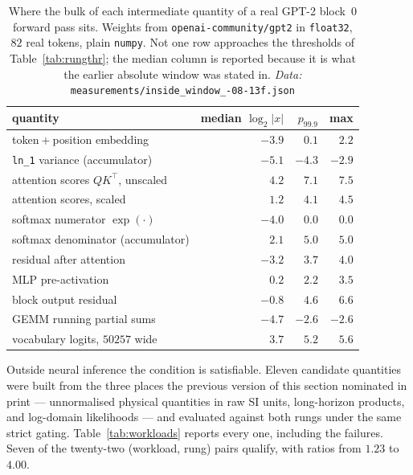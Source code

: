 \begin{table}[htbp]\centering
\caption{Where the bulk of each intermediate quantity of a real GPT-2 block~$0$
forward pass sits. Weights from \texttt{openai-community/gpt2} in \texttt{float32},
$82$ real tokens, plain \texttt{numpy}. Not one row approaches the thresholds of
Table~\ref{tab:rungthr}; the median column is reported because it is what the
earlier absolute window was stated in. \emph{Data:} \texttt{measurements/\allowbreak inside\_\allowbreak window\_-08-13f.json}}
\label{tab:landing}
\begin{tabular}{lrrr}
\hline
quantity & median $\log_2|x|$ & $p_{99.9}$ & max \\
\hline
token${}+{}$position embedding & $-3.9$ & $0.1$ & $2.2$ \\
\texttt{ln\_1} variance (accumulator) & $-5.1$ & $-4.3$ & $-2.9$ \\
attention scores $QK^{\!\top}$, unscaled & $4.2$ & $7.1$ & $7.5$ \\
attention scores, scaled & $1.2$ & $4.1$ & $4.5$ \\
softmax numerator $\exp(\cdot)$ & $-4.0$ & $0.0$ & $0.0$ \\
softmax denominator (accumulator) & $2.1$ & $5.0$ & $5.0$ \\
residual after attention & $-3.2$ & $3.7$ & $4.0$ \\
MLP pre-activation & $0.2$ & $2.2$ & $3.5$ \\
block output residual & $-0.8$ & $4.6$ & $6.6$ \\
GEMM running partial sums & $-4.7$ & $-2.6$ & $-2.6$ \\
vocabulary logits, $50257$ wide & $3.7$ & $5.2$ & $5.6$ \\
\hline
\end{tabular}
\end{table}

Outside neural inference the condition is satisfiable. Eleven candidate
quantities were built from the three places the previous version of this section
nominated in print --- unnormalised physical quantities in raw SI units,
long-horizon products, and log-domain likelihoods --- and evaluated against both
rungs under the same strict gating. Table~\ref{tab:workloads} reports every one,
including the failures. Seven of the twenty-two (workload, rung) pairs qualify,
with ratios from $1.23$ to $4.00$.


